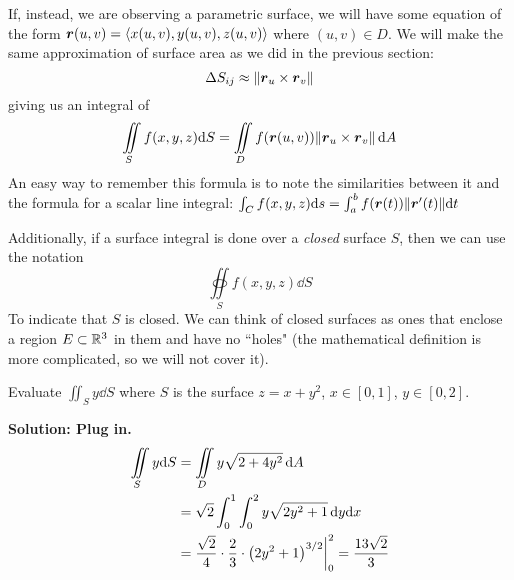 If, instead, we are observing a parametric surface, we will have some equation of the form $\boldsymbol{r}(u,v) = \left\langle x(u,v), y(u,v), z(u,v)\right\rangle$ where $(u,v)\in D$. We will make the same approximation of surface area as we did in the previous section:
\[ \Delta S_{ij} \approx \norm{\boldsymbol{r}_u \times \boldsymbol{r}_v}\]
giving us an integral of
\[ \iint\limits_S f(x,y,z)\dd S = \iint\limits_D f(\boldsymbol{r}(u,v))\norm{\boldsymbol{r}_u \times \boldsymbol{r}_v}\, \dd A\]
An easy way to remember this formula is to note the similarities between it and the formula for a scalar line integral: $\int_C f(x,y,z)\dd s = \int_a^b f(\boldsymbol{r}(t))\norm{\boldsymbol{r}'(t)}\dd t$ \par
Additionally, if a surface integral is done over a \textit{closed} surface $S$, then we can use the notation
\[ \oiint\limits_S f(x,y,z)\dd S\]
To indicate that $S$ is closed. We can think of closed surfaces as ones that enclose a region $E\subset\mathbb{R}^3$ in them and have no ``holes" (the mathematical definition is more complicated, so we will not cover it).
\begin{example}
    Evaluate $\iint_S y\dd S$ where $S$ is the surface $z=x+y^2$, $x\in[0, 1]$, $y\in[0,2]$.\par
    \bf{Solution:} Plug in.
    \begin{align*}
        \iint\limits_S y\dd S &= \iint\limits_D y\sqrt{2+4y^2}\, \dd A \\
        &= \sqrt{2} \int_0^1\int_0^2 y\sqrt{2y^2+1}\, \dd y \dd x \\
        &= \frac{\sqrt{2}}{4}\cdot\frac{2}{3} \cdot \pqty{2y^2+1}^{3/2}\biggr|_0^2 =\frac{13\sqrt{2}}{3}
    \end{align*}
\end{example}
